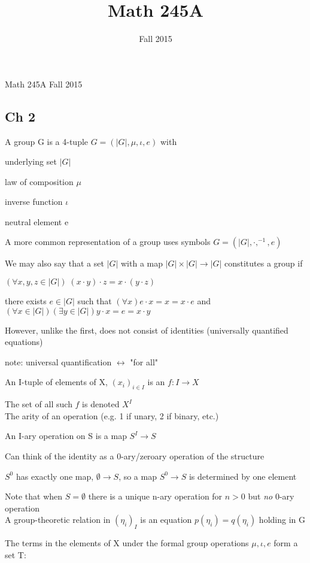 \documentclass[12pt]{article}
\title{Math 245A}
\date{\normalsize Fall 2015}
\begin{document}
\noindent
Math 245A Fall 2015

\subsection{Ch 2}

A group G is a 4-tuple $G = (|G|, \mu, \iota, e)$ with

underlying set $|G|$

law of composition $\mu$

inverse function $\iota$

neutral element e

\noindent
A more common representation of a group uses symbols $G = (|G|, \cdot, ^{-1}, e)$

\noindent
We may also say that a set $|G|$ with a map $|G| \times |G| \to |G|$ constitutes a group if

$(\forall x, y , z \in |G|)\;(x \cdot y) \cdot z =  x \cdot (y \cdot z)$

there exists $e \in |G|$ such that $(\forall x) e \cdot x = x = x \cdot e$ and $(\forall x \in |G|)(\exists y \in |G|) y \cdot x = e = x \cdot y$

\noindent
However, unlike the first, does not consist of identities (universally quantified equations)

note: universal quantification $\leftrightarrow$ "for all"

\noindent
An I-tuple of elements of X, $(x_i)_{i \in I}$ is an $f: I \to X$

The set of all such $f$ is denoted $X^I$\\

\noindent
The arity of an operation (e.g. 1 if unary, 2 if binary, etc.)

An I-ary operation on S is a map $S^I \to S$

\noindent
Can think of the identity as a 0-ary/zeroary operation of the structure

$S^0$ has exactly one map, $\emptyset \to S$, so a map $S^0 \to S$ is determined by one element

Note that when $S = \emptyset$ there is a unique n-ary operation for $n > 0$ but \textit{no} 0-ary operation\\

\noindent
A group-theoretic relation in $(\eta_i)_I$ is an equation $p(\eta_i) = q(\eta_i)$ holding in G

\noindent
The terms in the elements of X under the formal group operations $\mu, \iota, e$ form a set T:
\end{document}

